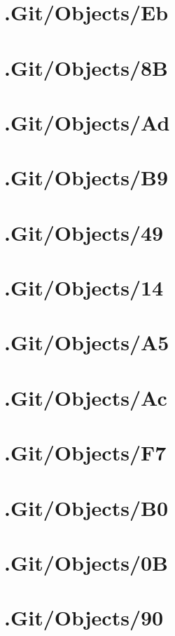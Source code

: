 \section*{.Git/Objects/Eb}

\section*{.Git/Objects/8B}

\section*{.Git/Objects/Ad}

\section*{.Git/Objects/B9}

\section*{.Git/Objects/49}

\section*{.Git/Objects/14}

\section*{.Git/Objects/A5}

\section*{.Git/Objects/Ac}

\section*{.Git/Objects/F7}

\section*{.Git/Objects/B0}

\section*{.Git/Objects/0B}

\section*{.Git/Objects/90}

